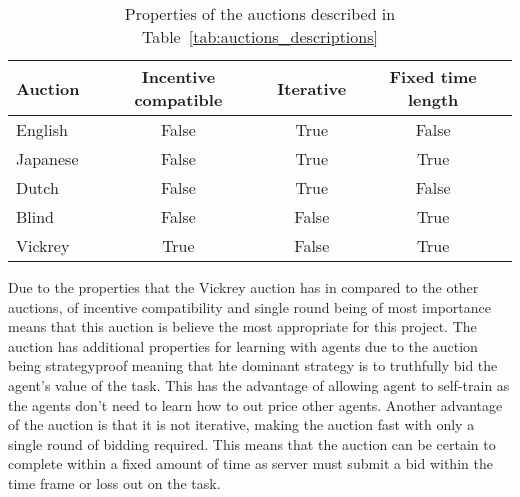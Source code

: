 \begin{table}[h]
    \centering
    \begin{tabular}{|l|c|c|c|} \hline
        Auction & Incentive compatible & Iterative & Fixed time length\\ \hline
        English & False & True & False \\ \hline
        Japanese & False & True & True \\ \hline
        Dutch & False & True & False \\ \hline
        Blind & False & False & True \\ \hline
        Vickrey & True & False & True \\ \hline
    \end{tabular}
    \caption{Properties of the auctions described in Table~\ref{tab:auctions_descriptions}}
    \label{tab:auction_properties}
\end{table}

Due to the properties that the Vickrey auction has in compared to the other auctions, of incentive compatibility and
single round being of most importance means that this auction is believe the most appropriate for this project. The
auction has additional properties for learning with agents due to the auction being strategyproof meaning that hte
dominant strategy is to truthfully bid the agent's value of the task. This has the advantage of allowing agent to
self-train as the agents don't need to learn how to out price other agents. Another advantage of the auction is that
it is not iterative, making the auction fast with only a single round of bidding required. This means that the auction
can be certain to complete within a fixed amount of time as server must submit a bid within the time frame or loss out
on the task.



